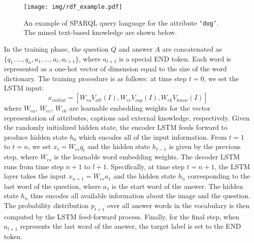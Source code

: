 \documentclass[10pt,journal,compsoc]{IEEEtran}
\def\Att{{V_{att}}}
\def\Cap{{V_{cap}}}
\def\Know{{V_{know}}}
\begin{document}
\begin{figure}[t]
  \centering
  \texttt{[image: img/rdf\_example.pdf]}
  \vspace{-3pt}
  \caption{An example of SPARQL query language for the attribute \texttt{`dog'}. The mined text-based knowledge are shown below.}
  \label{img:example_rdf}
  \vspace{-13pt}
\end{figure}

In the training phase, the question $Q$ and answer $A$ are concatenated as $\{q_1,...,q_n,a_1,...,a_l,a_{l+1}\}$, where $a_{l+1}$ is a special END token. Each word is represented as a one-hot vector of dimension equal to the size of the word dictionary. The training procedure is as follows: at time step $t=0$, we set the LSTM input: 
\begin{equation}
   x_{initial}=[ W_{ea}\Att(I), W_{ec}\Cap(I), W_{ek}\Know(I) ] 
\end{equation}
where $W_{ea}$, $W_{ec}$, $W_{ek}$ are learnable embedding weights for the vector representation of attributes, captions and external knowledge, respectively. Given the randomly initialized hidden state, the encoder LSTM feeds forward to produce  hidden state $h_{0}$ which encodes all of the input information. From $t=1$ to $t=n$, we set $x_t=W_{es}q_t$ and the hidden state $h_{t-1}$ is given by the previous step, where $W_{es}$ is the learnable word embedding weights. The decoder LSTM runs from time step $n+1$ to $l+1$. Specifically, at time step $t=n+1$, the LSTM layer takes the input $x_{n+1}=W_{es}a_1$ and the hidden state $h_{n}$ corresponding to the last word of the question, where $a_1$ is the start word of the answer. The hidden state $h_{n}$ thus encodes all available information about the image and the question. The probability distribution $p_{t+1}$ over all answer words in the vocabulary is then computed by the LSTM feed-forward process. Finally, for the final step, when $a_{l+1}$ represents the last word of the answer, the target label is set to the END token.
\end{document}
